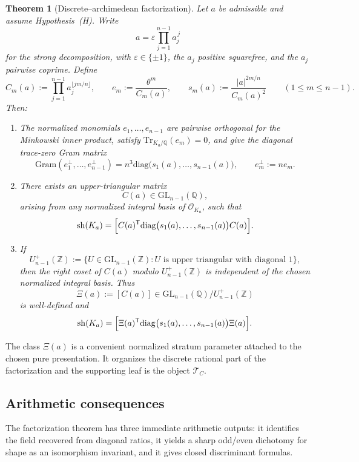 \documentclass[11pt,letterpaper]{amsart}
\newcommand{\Q}{\mathbb{Q}}
\newcommand{\Z}{\mathbb{Z}}
\newcommand{\cO}{\mathcal{O}}
\newcommand{\GL}{\mathrm{GL}}
\newcommand{\Tr}{\mathrm{Tr}}
\newcommand{\sh}{\mathrm{sh}}
\newcommand{\diag}{\mathrm{diag}}
\theoremstyle{plain}
\newtheorem{theorem}{Theorem}[section]
\theoremstyle{definition}
\begin{document}
\begin{theorem}[Discrete--archimedean factorization]
\label{thm:intro-factorization}
Let \(a\) be admissible and assume Hypothesis~\textup{(H)}.  Write
\[
a=\varepsilon\prod_{j=1}^{n-1} a_j^{\,j}
\]
for the strong decomposition, with \(\varepsilon\in\{\pm1\}\), the \(a_j\)
positive squarefree, and the \(a_j\) pairwise coprime.  Define
\[
C_m(a):=\prod_{j=1}^{n-1} a_j^{\lfloor jm/n\rfloor},
\qquad
e_m:=\frac{\theta^m}{C_m(a)},
\qquad
s_m(a):=\frac{|a|^{2m/n}}{C_m(a)^2}
\qquad
(1\le m\le n-1).
\]
Then:
\begin{enumerate}[label=\textup{(\roman*)},leftmargin=2.8em]
\item
The normalized monomials \(e_1,\dots,e_{n-1}\) are pairwise orthogonal for the
Minkowski inner product, satisfy \(\Tr_{K_a/\Q}(e_m)=0\), and give the diagonal
trace-zero Gram matrix
\[
\mathrm{Gram}(e_1^\perp,\dots,e_{n-1}^\perp)
=
n^3\diag\bigl(s_1(a),\dots,s_{n-1}(a)\bigr),
\qquad
e_m^\perp:=n e_m.
\]

\item
There exists an upper-triangular matrix
\[
C(a)\in \GL_{n-1}(\Q),
\]
arising from any normalized integral basis of \(\cO_{K_a}\), such that
\[
\sh(K_a)
=
\Bigl[
C(a)^{\mathsf T}\diag\bigl(s_1(a),\dots,s_{n-1}(a)\bigr)C(a)
\Bigr].
\]

\item
If
\[
U_{n-1}^+(\Z)
:=
\{U\in \GL_{n-1}(\Z): U \text{ is upper triangular with diagonal }1\},
\]
then the right coset of \(C(a)\) modulo \(U_{n-1}^+(\Z)\) is independent of the
chosen normalized integral basis.  Thus
\[
\Xi(a):=[C(a)]\in \GL_{n-1}(\Q)/U_{n-1}^+(\Z)
\]
is well-defined and
\[
\sh(K_a)
=
\Bigl[
\Xi(a)^{\mathsf T}\diag\bigl(s_1(a),\dots,s_{n-1}(a)\bigr)\Xi(a)
\Bigr].
\]
\end{enumerate}
\end{theorem}

The class \(\Xi(a)\) is a convenient normalized stratum parameter attached to
the chosen pure presentation.  It organizes the discrete rational part of the
factorization and the
supporting leaf is the object \(\mathcal T_C\).

\subsection{Arithmetic consequences}

The factorization theorem has three immediate arithmetic outputs: it identifies
the field recovered from diagonal ratios, it yields a sharp odd/even dichotomy
for shape as an isomorphism invariant, and it gives closed discriminant
formulas.
\end{document}
